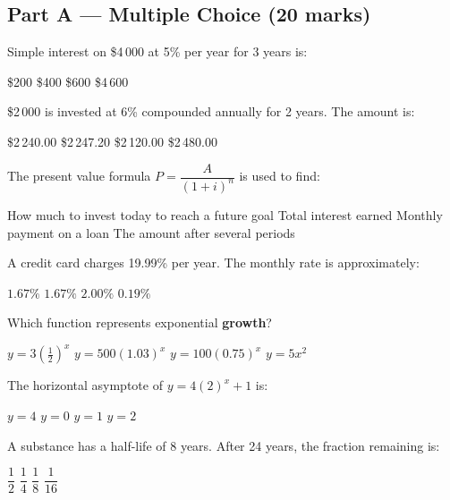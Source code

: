 \documentclass[addpoints]{exam}
\begin{document}
\newpage
\begin{questions}

\section*{Part A --- Multiple Choice (20 marks)}
\vspace{5mm}

\question[1] Simple interest on \$4\,000 at 5\% per year for 3 years is:
\begin{choices}
    \choice \$200
    \choice \$400
    \correctchoice \$600
    \choice \$4\,600
\end{choices}

\question[1] \$2\,000 is invested at 6\% compounded annually for 2 years. The amount is:
\begin{choices}
    \choice \$2\,240.00
    \correctchoice \$2\,247.20
    \choice \$2\,120.00
    \choice \$2\,480.00
\end{choices}

\question[1] The present value formula $P = \dfrac{A}{(1+i)^n}$ is used to find:
\begin{choices}
    \correctchoice How much to invest today to reach a future goal
    \choice Total interest earned
    \choice Monthly payment on a loan
    \choice The amount after several periods
\end{choices}

\question[1] A credit card charges 19.99\% per year. The monthly rate is approximately:
\begin{choices}
    \choice $1.67\%$
    \correctchoice $1.67\%$
    \choice $2.00\%$
    \choice $0.19\%$
\end{choices}

\question[1] Which function represents exponential \textbf{growth}?
\begin{choices}
    \choice $y = 3\left(\tfrac{1}{2}\right)^x$
    \correctchoice $y = 500(1.03)^x$
    \choice $y = 100(0.75)^x$
    \choice $y = 5x^2$
\end{choices}

\question[1] The horizontal asymptote of $y = 4(2)^x + 1$ is:
\begin{choices}
    \choice $y = 4$
    \choice $y = 0$
    \correctchoice $y = 1$
    \choice $y = 2$
\end{choices}

\question[1] A substance has a half-life of 8 years. After 24 years, the fraction remaining is:
\begin{choices}
    \choice $\dfrac{1}{2}$
    \choice $\dfrac{1}{4}$
    \correctchoice $\dfrac{1}{8}$
    \choice $\dfrac{1}{16}$
\end{choices}


\end{questions}
\end{document}
